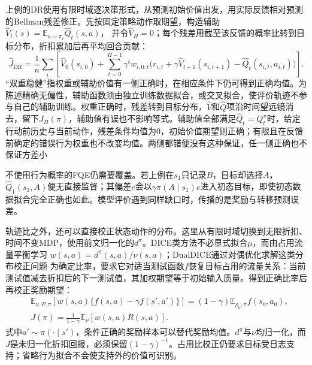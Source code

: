 上例的DR使用有限时域逐决策形式，从预测初始价值出发，用实际反馈相对预测的Bellman残差修正。先按固定策略动作取期望，构造辅助
$\widehat V_t(s)=\mathbb E_{a\sim\pi_t}\widehat Q_t(s,a)$，
并令$\widehat V_H=0$；每个残差用截至该反馈的概率比转到目标分布，折扣累加后再平均回合贡献：
\begin{equation}
  \label{eq:rl-information-dr}
  \widehat J_{\mathrm{DR}}
  =\frac1n\sum_i\left[
    \widehat V_0(s_{i,0})
    +\sum_{t=0}^{H-1}\gamma^t w_{i,0:t}
       \bigl(r_{i,t}+\gamma\widehat V_{t+1}(s_{i,t+1})
                         -\widehat Q_t(s_{i,t},a_{i,t})\bigr)
    \right].
\end{equation}
“双重稳健”指权重或辅助价值有一侧正确时，在相应条件下仍可得到正确均值。为陈述精确无偏性，辅助函数须由独立训练数据拟合，或交叉拟合，使评价轨迹不参与自己的辅助训练。权重正确时，残差转到目标分布，$\widehat V$和$\widehat Q$项沿时间望远镜消去，留下$J_H(\pi)$，辅助值有误也不影响等式。辅助值全部满足$\widehat Q_t=Q_t^\pi$时，给定行动前历史与当前动作，残差条件均值为0，初始价值期望则正确；有限且在反馈前确定的错误行为权重也不改变均值。两侧都错便没有这种保证，任一侧正确也不保证方差小

不使用行为概率的FQE仍需要覆盖。若上例在$s_1$只记录$B$，目标却选择$A$，$\widehat Q_1(s_1,A)$便无直接监督；其偏差$e$会以$\gamma\pi(A\mid s_1)e$进入初态目标，即使初态数据拟合完全正确也如此。模型评价遇到同样缺口时，传播的是奖励与转移预测误差。

轨迹比之外，还可以直接校正状态动作的分布。这里从有限时域切换到无限折扣、时间不变MDP，使用前文归一化的$d^\pi$。DICE类方法不必显式拟合$\mu$，而由占用流量平衡学习
$w(s,a)=d^\pi(s,a)/\nu(s,a)$；DualDICE通过对偶优化求解这类分布校正问题
为确定比率，要求它对适当测试函数$f$恢复目标占用的流量关系：当前测试值减去折扣后的下一测试值，其加权期望等于初始输入质量。得到正确比率后再校正奖励期望：
\begin{align}
  \label{eq:rl-information-dice}
  &\mathbb E_{\nu,P,\pi}\!
       \left[w(s,a)\{f(s,a)-\gamma f(s',a')\}\right]
       =(1-\gamma)\mathbb E_{\rho_0,\pi}f(s_0,a_0),\nonumber\\
  &J(\pi)=\frac{1}{1-\gamma}\mathbb E_\nu[w(s,a)R(s,a)].
\end{align}
式中$a'\sim\pi(\cdot\mid s')$，条件正确的奖励样本可以替代奖励均值。$d^\pi$与$\nu$均归一化，而$J$是未归一化折扣回报，必须保留$(1-\gamma)^{-1}$。占用比校正仍要求目标受日志支持；省略行为拟合不会使支持外的价值可识别。

